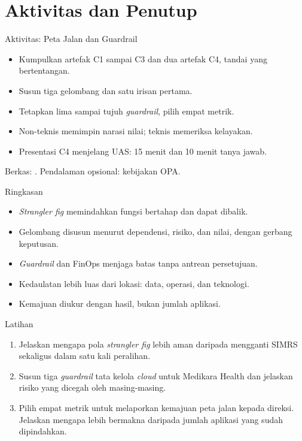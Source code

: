 \documentclass[aspectratio=169, table, 12pt]{beamer}
\begin{document}
\section{Aktivitas dan Penutup}

\begin{frame}{{\Large Aktivitas: Peta Jalan dan Guardrail}}
  \vspace{6pt}
  \begin{itemize}
    \item Kumpulkan artefak C1 sampai C3 dan dua artefak C4, tandai yang bertentangan.
    \item Susun tiga gelombang dan satu irisan pertama.
    \item Tetapkan lima sampai tujuh \textit{guardrail}, pilih empat metrik.
    \item Non-teknis memimpin narasi nilai; teknis memeriksa kelayakan.
    \item Presentasi C4 menjelang UAS: 15 menit dan 10 menit tanya jawab.
  \end{itemize}
  \vspace{6pt}
  {\small Berkas: . Pendalaman opsional: kebijakan OPA.}
\end{frame}

\begin{frame}{{\Large Ringkasan}}
  \vspace{10pt}
  \begin{itemize}
    \item \textit{Strangler fig} memindahkan fungsi bertahap dan dapat dibalik.
    \item Gelombang disusun menurut dependensi, risiko, dan nilai, dengan gerbang keputusan.
    \item \textit{Guardrail} dan FinOps menjaga batas tanpa antrean persetujuan.
    \item Kedaulatan lebih luas dari lokasi: data, operasi, dan teknologi.
    \item Kemajuan diukur dengan hasil, bukan jumlah aplikasi.
  \end{itemize}
\end{frame}

\begin{frame}{{\Large Latihan}}
  \vspace{10pt}
  \begin{enumerate}
    \item Jelaskan mengapa pola \textit{strangler fig} lebih aman daripada mengganti SIMRS sekaligus
          dalam satu kali peralihan.
    \item Susun tiga \textit{guardrail} tata kelola \textit{cloud} untuk Medikara Health dan
          jelaskan risiko yang dicegah oleh masing-masing.
    \item Pilih empat metrik untuk melaporkan kemajuan peta jalan kepada direksi. Jelaskan mengapa
          lebih bermakna daripada jumlah aplikasi yang sudah dipindahkan.
  \end{enumerate}
\end{frame}
\end{document}
